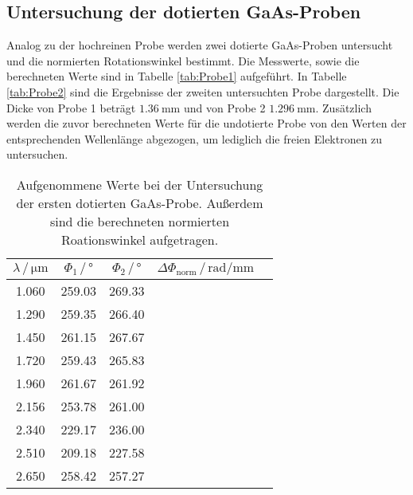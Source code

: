    \subsection{Untersuchung der dotierten GaAs-Proben}
   Analog zu der hochreinen Probe werden zwei dotierte GaAs-Proben untersucht und die normierten Rotationswinkel 
   bestimmt. Die Messwerte, sowie die berechneten Werte sind in Tabelle \ref{tab:Probe1} aufgeführt. 
   In Tabelle \ref{tab:Probe2} sind die Ergebnisse der zweiten untersuchten Probe dargestellt. Die Dicke 
   von Probe 1 beträgt $\SI{1.36}{\milli\meter}$ und von Probe 2 $\SI{1.296}{\milli\meter}$. Zusätzlich 
   werden die zuvor berechneten Werte für die undotierte Probe von den Werten der entsprechenden Wellenlänge 
   abgezogen, um lediglich die freien Elektronen zu untersuchen.
   \begin{table}[H]
    \centering
    \caption{Aufgenommene Werte bei der Untersuchung der ersten dotierten GaAs-Probe. Außerdem sind die 
    berechneten normierten Roationswinkel aufgetragen.}
    \label{tab:tab:Probe1}
    \begin{tabular}{ccccc}
      \toprule
      $\lambda\, / \, \si{\micro\meter}$ & $\Phi_1 \, / \, \si{\degree}$ & $\Phi_2 \, / \, \si{\degree}$ & $\Delta\Phi_\text{norm} \, / \, \si{\radian\per\milli\meter}$  \\
      \midrule
      1.060 & 259.03 & 269.33 &   \\
      1.290 & 259.35 & 266.40 &   \\
      1.450 & 261.15 & 267.67 &   \\
      1.720 & 259.43 & 265.83 &   \\
      1.960 & 261.67 & 261.92 &   \\
      2.156 & 253.78 & 261.00 &   \\
      2.340 & 229.17 & 236.00 &   \\
      2.510 & 209.18 & 227.58 &   \\
      2.650 & 258.42 & 257.27 &   \\
      \bottomrule
    \end{tabular}
   \end{table} \noindent


